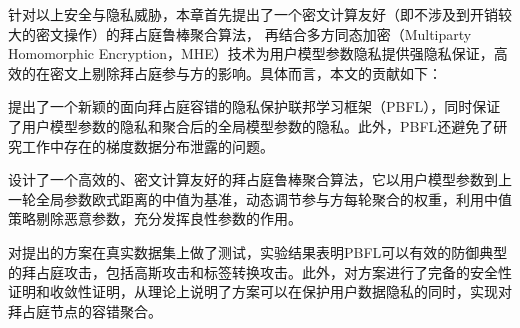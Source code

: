 
针对以上安全与隐私威胁，本章首先提出了一个密文计算友好（即不涉及到开销较大的密文操作）的拜占庭鲁棒聚合算法，
再结合多方同态加密（Multiparty Homomorphic Encryption，MHE）技术为用户模型参数隐私提供强隐私保证，高效的在密文上剔除拜占庭参与方的影响。具体而言，本文的贡献如下：
\begin{compactenum}
	\item 提出了一个新颖的面向拜占庭容错的隐私保护联邦学习框架（PBFL），同时保证了用户模型参数的隐私和聚合后的全局模型参数的隐私。此外，PBFL还避免了研究工作\cite{liu2021privacy}中存在的梯度数据分布泄露的问题。
	\item 设计了一个高效的、密文计算友好的拜占庭鲁棒聚合算法，它以用户模型参数到上一轮全局参数欧式距离的中值为基准，动态调节参与方每轮聚合的权重，利用中值策略剔除恶意参数，充分发挥良性参数的作用。
	\item 对提出的方案在真实数据集上做了测试，实验结果表明PBFL可以有效的防御典型的拜占庭攻击，包括高斯攻击和标签转换攻击。此外，对方案进行了完备的安全性证明和收敛性证明，从理论上说明了方案可以在保护用户数据隐私的同时，实现对拜占庭节点的容错聚合。
\end{compactenum}


